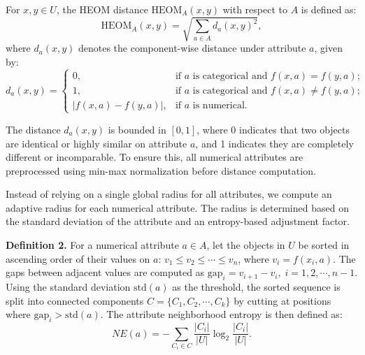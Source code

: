 \documentclass[lettersize,journal]{IEEEtran}
\begin{document}
For \(x, y \in U\), the HEOM distance \(\text{HEOM}_{A}(x, y)\) with respect to \(A\) is defined as:
\begin{equation}
\text{HEOM}_{A}(x, y) = \sqrt{\sum_{a \in A} d_{a}(x, y)^{2}},
\end{equation}
where \(d_{a}(x, y)\) denotes the component-wise distance under attribute \(a\), given by:
\begin{equation}
d_{a}(x, y) = \begin{cases}
0, & \text{if } a \text{ is categorical and } f(x,a) = f(y,a); \\
1, & \text{if } a \text{ is categorical and } f(x,a) \neq f(y,a); \\
|f(x,a) - f(y,a)|, & \text{if } a \text{ is numerical}.
\end{cases}
\end{equation}

The distance \(d_{a}(x, y)\) is bounded in \([0, 1]\), where 0 indicates that two objects are identical
or highly similar on attribute \(a\), and 1 indicates they are completely different or incomparable. To
ensure this, all numerical attributes are preprocessed using min-max normalization before distance
computation.

Instead of relying on a single global radius for all attributes, we compute an adaptive radius for each
numerical attribute. The radius is determined based on the standard deviation of the attribute and an
entropy-based adjustment factor.

\textbf{Definition 2.} For a numerical attribute \(a \in A\), let the objects in \(U\) be sorted in
ascending order of their values on \(a\): \(v_{1} \leq v_{2} \leq \cdots \leq v_{n}\), where
\(v_{i} = f(x_{i}, a)\). The gaps between adjacent values are computed as
\(\text{gap}_{i} = v_{i+1} - v_{i},\; i = 1, 2, \cdots, n-1\). Using the standard deviation
\(\text{std}(a)\) as the threshold, the sorted sequence is split into connected components
\(C = \{C_{1}, C_{2}, \cdots, C_{k}\}\) by cutting at positions where \(\text{gap}_{i} > \text{std}(a)\).
The attribute neighborhood entropy is then defined as:
\begin{equation}
NE(a) = -\sum_{C_{i} \in C} \frac{|C_{i}|}{|U|} \log_{2} \frac{|C_{i}|}{|U|}.
\end{equation}
\end{document}
